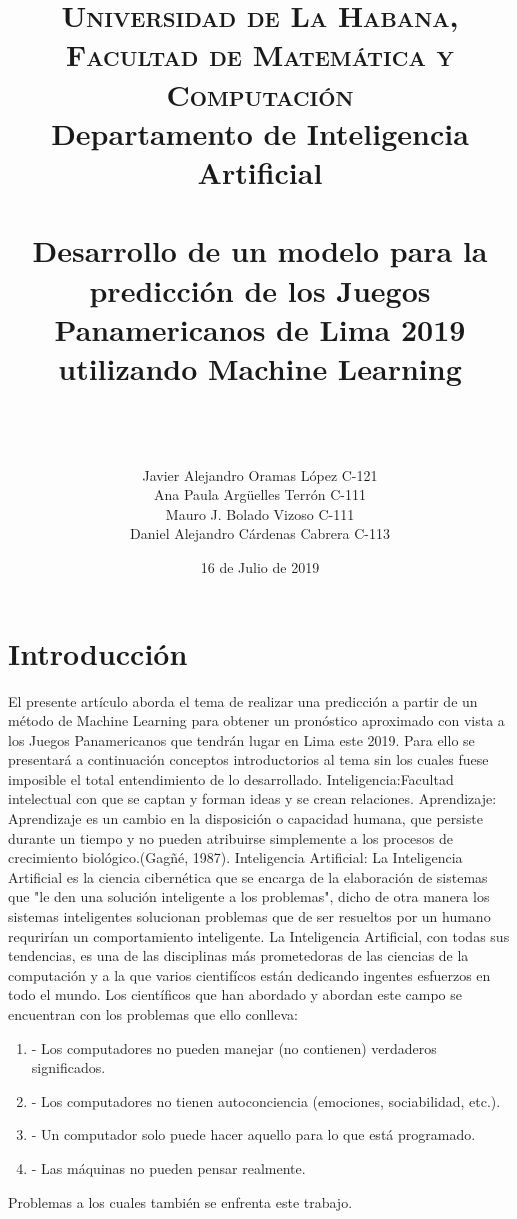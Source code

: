 \documentclass[a4paper,12pt]{article}
\title{
\normalfont \normalsize
\textsc{Universidad de La Habana, Facultad de Matem\'{a}tica y Computaci\'{o}n } \\
Departamento de Inteligencia Artificial\\[25pt] %
\horrule{0.5pt} \\[0.4cm] %
\huge Desarrollo de un modelo para la predicci\'{o}n de los Juegos Panamericanos de Lima 2019 utilizando Machine Learning \\ %
\horrule{2pt} \\[0.5cm] %
}
\author{\\\name Javier Alejandro Oramas L\'{o}pez C-121
\\
\name Ana Paula Arg\"{u}elles Terr\'{o}n C-111
\\
\name Mauro J. Bolado Vizoso C-111
\\
\name Daniel Alejandro C\'{a}rdenas Cabrera C-113
}
\date{16 de Julio de 2019} %
\begin{document}
\maketitle
\newpage
\section{Introducci\'{o}n}
	\cline{-}El presente art\'{i}culo aborda el tema de realizar una predicci\'{o}n a partir de un m\'{e}todo de Machine Learning para obtener un pron\'{o}stico aproximado con vista a los Juegos Panamericanos que tendr\'{a}n lugar en Lima este 2019.
 	\cline{-} Para ello se presentar\'{a} a continuaci\'{o}n conceptos introductorios al tema sin los cuales fuese imposible el total entendimiento de lo desarrollado.
	\cline{-} Inteligencia:Facultad intelectual con que se captan y forman ideas y se crean  relaciones.
	\cline{-} Aprendizaje: Aprendizaje es un cambio en la disposici\'{o}n o capacidad humana, que persiste durante un tiempo y no pueden atribuirse simplemente a los procesos de crecimiento biol\'{o}gico.(Gag\~{n}\'{e}, 1987).
	\cline{-} Inteligencia Artificial: La Inteligencia Artificial es la ciencia cibern\'{e}tica que se encarga de la elaboraci\'{o}n de sistemas que "le den una soluci\'{o}n inteligente a los problemas", dicho de otra manera los sistemas inteligentes solucionan problemas que de ser resueltos por un humano requrir\'{i}an un comportamiento inteligente. La Inteligencia Artificial, con todas sus tendencias, es una de las disciplinas m\'{a}s prometedoras de las ciencias de la computaci\'{o}n y a la que varios cientif\'{i}cos est\'{a}n dedicando ingentes esfuerzos en todo el mundo.
	\cline{-} Los cient\'{i}ficos que han abordado y abordan este campo se encuentran con los problemas que ello conlleva:
	\begin{enumerate}
	\item -	Los computadores no pueden manejar (no contienen) verdaderos significados.
	\item -	Los computadores no tienen autoconciencia (emociones, sociabilidad, etc.).
	\item -	Un computador solo puede hacer aquello para lo que est\'{a} programado.
	\item -	Las m\'{a}quinas no pueden pensar realmente.
	\end{enumerate}
Problemas a los cuales tambi\'{e}n se enfrenta este trabajo.
\newpage
\end{document}
